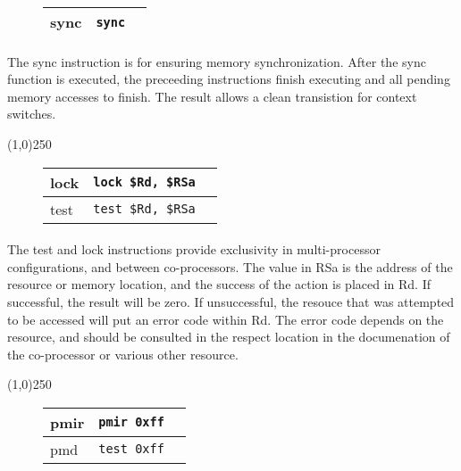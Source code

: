 \documentclass[letterpaper, 11pt]{article}
\begin{document}
\begin{figure}[!h]
	\begin{center}
		\begin{tabular}{|l|l|l|}
			\hline
			sync		& \texttt{sync}	\\ \hline
		 		\end{tabular} 
	\end{center}
	
\end{figure}
\paragraph{} The sync instruction is for ensuring memory synchronization. After the sync function is executed, the preceeding instructions
finish executing and all pending memory accesses to finish. The result allows a clean transistion for context switches.

\begin{center}
	\line(1,0){250}
\end{center}

\begin{figure}[!h]
	\begin{center}
		\begin{tabular}{|l|l|l|}
			\hline
			lock		& \texttt{lock \$Rd, \$RSa}	\\ \hline
			test		& \texttt{test \$Rd, \$RSa}	\\ \hline
		 		\end{tabular} 
	\end{center}
	
\end{figure}
\paragraph{} The test and lock instructions provide exclusivity in multi-processor configurations, and between co-processors. The
value in RSa is the address of the resource or memory location, and the success of the action is placed in Rd. If successful,
the result will be zero. If unsuccessful, the resouce that was attempted to be accessed will put an error code within Rd.
The error code depends on the resource, and should be consulted in the respect location in the documenation of the co-processor or
various other resource.

\begin{center}
	\line(1,0){250}
\end{center}

\begin{figure}[!h]
	\begin{center}
		\begin{tabular}{|l|l|l|}
			\hline
			pmir	& \texttt{pmir	0xff}	\\ \hline
			pmd		& \texttt{test	0xff}	\\ \hline
		 		\end{tabular} 
	\end{center}
	
\end{figure}
\end{document}
